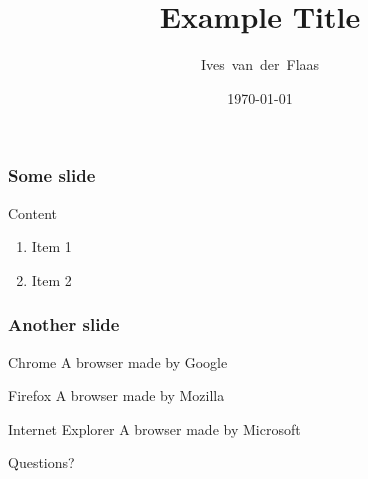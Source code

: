 \documentclass[pdflatex,compress,usenames, dvipsnames]{beamer}
\title{Example Title}
\date{\today}
\author{Ives~van~der~Flaas}
\let\OldFrameTitle\frametitle
\renewcommand{\frametitle}[1]{\OldFrameTitle{#1} \vspace{-1cm}}
\newcommand{\coloremph}[1]{{\color{lime} #1}}
\newenvironment{description*}[0]
{
\begin{itemize}
\let\OldItem\item
\renewcommand{\item}[1]{\OldItem \coloremph{##1} \\ }
}{
\end{itemize}
}
\begin{document}
\maketitle

\begin{frame}
	\frametitle{Some slide}
	Content
	\begin{enumerate}
		\item Item 1
		\item Item 2
	\end{enumerate}
\end{frame}

\begin{frame}
	\frametitle{Another slide}
	\begin{description*}
		\item{Chrome} A browser made by Google
		\item{Firefox} A browser made by Mozilla
		\item{Internet Explorer} A browser made by Microsoft
	\end{description*}
\end{frame}

\begin{frame}
	\begin{center}
		\Huge Questions?
	\end{center}
\end{frame}
\end{document}
